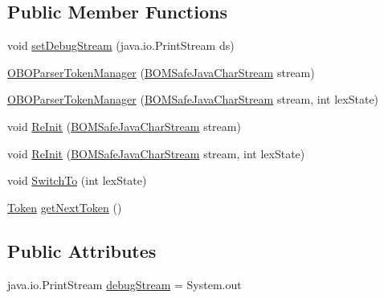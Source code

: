 \subsection*{Public Member Functions}
\begin{DoxyCompactItemize}
\item 
void \hyperlink{classorg_1_1coode_1_1owlapi_1_1obo_1_1parser_1_1_o_b_o_parser_token_manager_aa673f36837fd223aff8da97fd49ba63d}{set\-Debug\-Stream} (java.\-io.\-Print\-Stream ds)
\item 
\hyperlink{classorg_1_1coode_1_1owlapi_1_1obo_1_1parser_1_1_o_b_o_parser_token_manager_ad2e642c8997c3bf38504be48970e45b1}{O\-B\-O\-Parser\-Token\-Manager} (\hyperlink{classuk_1_1ac_1_1manchester_1_1cs_1_1_b_o_m_safe_java_char_stream}{B\-O\-M\-Safe\-Java\-Char\-Stream} stream)
\item 
\hyperlink{classorg_1_1coode_1_1owlapi_1_1obo_1_1parser_1_1_o_b_o_parser_token_manager_a0540d0dda0c55d62116fdb4b2c4e18e7}{O\-B\-O\-Parser\-Token\-Manager} (\hyperlink{classuk_1_1ac_1_1manchester_1_1cs_1_1_b_o_m_safe_java_char_stream}{B\-O\-M\-Safe\-Java\-Char\-Stream} stream, int lex\-State)
\item 
void \hyperlink{classorg_1_1coode_1_1owlapi_1_1obo_1_1parser_1_1_o_b_o_parser_token_manager_a95bbcc40791626452ff8987e1aab17e7}{Re\-Init} (\hyperlink{classuk_1_1ac_1_1manchester_1_1cs_1_1_b_o_m_safe_java_char_stream}{B\-O\-M\-Safe\-Java\-Char\-Stream} stream)
\item 
void \hyperlink{classorg_1_1coode_1_1owlapi_1_1obo_1_1parser_1_1_o_b_o_parser_token_manager_a08302012bbadcd4338eef247428f5ecc}{Re\-Init} (\hyperlink{classuk_1_1ac_1_1manchester_1_1cs_1_1_b_o_m_safe_java_char_stream}{B\-O\-M\-Safe\-Java\-Char\-Stream} stream, int lex\-State)
\item 
void \hyperlink{classorg_1_1coode_1_1owlapi_1_1obo_1_1parser_1_1_o_b_o_parser_token_manager_a177be881fa2fe88f5893d83e801895fe}{Switch\-To} (int lex\-State)
\item 
\hyperlink{classorg_1_1coode_1_1owlapi_1_1obo_1_1parser_1_1_token}{Token} \hyperlink{classorg_1_1coode_1_1owlapi_1_1obo_1_1parser_1_1_o_b_o_parser_token_manager_a7572b1f1b934ea69a42a932fa60495ae}{get\-Next\-Token} ()
\end{DoxyCompactItemize}
\subsection*{Public Attributes}
\begin{DoxyCompactItemize}
\item 
java.\-io.\-Print\-Stream \hyperlink{classorg_1_1coode_1_1owlapi_1_1obo_1_1parser_1_1_o_b_o_parser_token_manager_a11fa30573af750c2ba79784afade1425}{debug\-Stream} = System.\-out
\end{DoxyCompactItemize}
